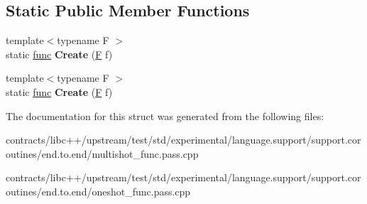 \subsection*{Static Public Member Functions}
\begin{DoxyCompactItemize}
\item 
\mbox{\label{structfunc_ac1f7fc5831c2f7677078566398332b0a}} 
{\footnotesize template$<$typename F $>$ }\\static \mbox{\hyperlink{structfunc}{func}} {\bfseries Create} (\mbox{\hyperlink{struct_f}{F}} f)
\item 
\mbox{\label{structfunc_ac1f7fc5831c2f7677078566398332b0a}} 
{\footnotesize template$<$typename F $>$ }\\static \mbox{\hyperlink{structfunc}{func}} {\bfseries Create} (\mbox{\hyperlink{struct_f}{F}} f)
\end{DoxyCompactItemize}


The documentation for this struct was generated from the following files\+:\begin{DoxyCompactItemize}
\item 
contracts/libc++/upstream/test/std/experimental/language.\+support/support.\+coroutines/end.\+to.\+end/multishot\+\_\+func.\+pass.\+cpp\item 
contracts/libc++/upstream/test/std/experimental/language.\+support/support.\+coroutines/end.\+to.\+end/oneshot\+\_\+func.\+pass.\+cpp\end{DoxyCompactItemize}
